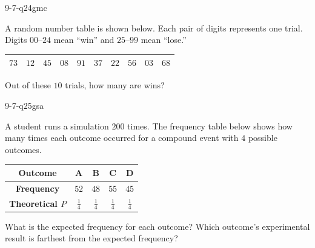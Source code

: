 \begin{practiceQuestion}{9-7-q24}{gmc}
\begin{questionText}
A random number table is shown below. Each pair of digits represents one trial. Digits $00$--$24$ mean ``win'' and $25$--$99$ mean ``lose.''

\begin{center}
\begin{tabular}{|c|c|c|c|c|c|c|c|c|c|}
\hline
$73$ & $12$ & $45$ & $08$ & $91$ & $37$ & $22$ & $56$ & $03$ & $68$ \\
\hline
\end{tabular}
\end{center}

Out of these $10$ trials, how many are wins?
\end{questionText}
\end{practiceQuestion}


\begin{practiceQuestion}{9-7-q25}{gsa}
\begin{questionText}
A student runs a simulation $200$ times. The frequency table below shows how many times each outcome occurred for a compound event with $4$ possible outcomes.

\begin{center}
\begin{tabular}{|c|c|c|c|c|}
\hline
\textbf{Outcome} & A & B & C & D \\
\hline
\textbf{Frequency} & $52$ & $48$ & $55$ & $45$ \\
\hline
\textbf{Theoretical $P$} & $\frac{1}{4}$ & $\frac{1}{4}$ & $\frac{1}{4}$ & $\frac{1}{4}$ \\
\hline
\end{tabular}
\end{center}

What is the expected frequency for each outcome? Which outcome's experimental result is farthest from the expected frequency?
\end{questionText}
\end{practiceQuestion}

